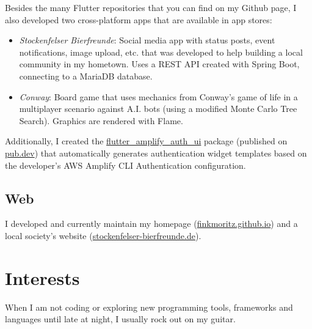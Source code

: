 \documentclass[letterpaper]{twentysecondcv} %
\begin{document}
Besides the many Flutter repositories that you can find on my Github page, I also developed two cross-platform apps that are available in app stores:
\begin{itemize}
\item \textit{\color{gray}Stockenfelser Bierfreunde}: Social media app with status posts, event notifications, image upload, etc. that was developed to help building a local community in my hometown. Uses a REST API created with Spring Boot, connecting to a MariaDB database.
\item \textit{\color{gray}Conway}: Board game that uses mechanics from Conway's game of life in a multiplayer scenario against A.I. bots (using a modified Monte Carlo Tree Search). Graphics are rendered with Flame.
\end{itemize}
Additionally, I created the \href{https://pub.dev/packages/flutter_amplify_auth_ui}{flutter\_amplify\_auth\_ui} package (published on \href{https://pub.dev/packages/flutter_amplify_auth_ui}{pub.dev}) that automatically generates authentication widget templates based on the developer's AWS Amplify CLI Authentication configuration.

\subsection{Web}

I developed and currently maintain my homepage (\href{https://finkmoritz.github.io}{finkmoritz.github.io}) and a local society's website (\href{https://www.stockenfelser-bierfreunde.de}{stockenfelser-bierfreunde.de}).
\\



\section{{\normalsize{}} Interests}

When I am not coding or exploring new programming tools, frameworks and languages until late at night, I usually rock out on my guitar.


\end{document}

